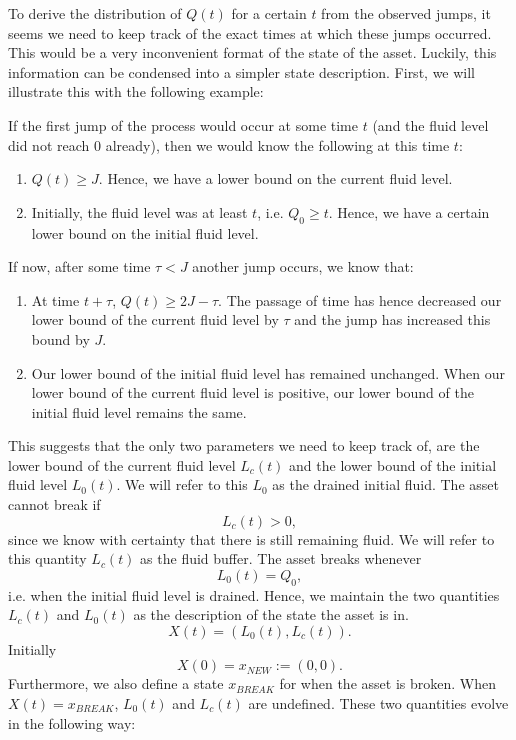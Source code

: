 To derive the distribution of $Q(t)$ for a certain $t$ from the observed jumps, it seems we need to keep track of the exact times at which these jumps occurred.
This would be a very inconvenient format of the state of the asset.
Luckily, this information can be condensed into a simpler state description.
First, we will illustrate this with the following example:
\begin{example}
	If the first jump of the process would occur at some time $t$ (and the fluid level did not reach $0$ already), then we would know the following at this time $t$:
	\begin{enumerate}
		\item $Q(t)\geq J$.
		Hence, we have a lower bound on the current fluid level.
		\item Initially, the fluid level was at least $t$, i.e. $Q_0\geq t$.
		Hence, we have a certain lower bound on the initial fluid level.
	\end{enumerate}
	If now, after some time $\tau<J$ another jump occurs, we know that:
	\begin{enumerate}
		\item At time $t+\tau$, $Q(t)\geq 2J-\tau$.
		The passage of time has hence decreased our lower bound of the current fluid level by $\tau$ and the jump has increased this bound by $J$.
		\item Our lower bound of the initial fluid level has remained unchanged.
		When our lower bound of the current fluid level is positive, our lower bound of the initial fluid level remains the same.
	\end{enumerate}
\end{example}
This suggests that the only two parameters we need to keep track of, are the lower bound of the current fluid level $L_c(t)$ and the lower bound of the initial fluid level $L_0(t)$.
We will refer to this $L_0$ as the drained initial fluid.
The asset cannot break if 
\[L_c(t)>0,\]
since we know with certainty that there is still remaining fluid.
We will refer to this quantity $L_c(t)$ as the fluid buffer.
The asset breaks whenever
\[L_0(t)=Q_0,\]
i.e. when the initial fluid level is drained.
Hence, we maintain the two quantities $L_c(t)$ and $L_0(t)$ as the description of the state the asset is in.
\[
X(t)=(L_0(t),L_c(t)).
\]
Initially
\[
X(0)=x_{NEW}:=(0,0).
\]
Furthermore, we also define a state $x_{BREAK}$ for when the asset is broken.
When $X(t)=x_{BREAK}$, $L_0(t)$ and $L_c(t)$ are undefined.
These two quantities evolve in the following way:

